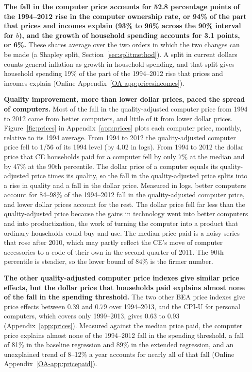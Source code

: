 \documentclass[11pt]{article}
\begin{document}
\textbf{The fall in the computer price accounts for 52.8 percentage points of the 1994--2012 rise in the computer ownership rate, or 94\% of the part that prices and incomes explain (93\% to 96\% across the 90\% interval for $b$), and the growth of household spending accounts for 3.1 points, or 6\%.} These shares average over the two orders in which the two changes can be made (a Shapley split, Section~\ref{sec:splitmethod}). A split in current dollars counts general inflation as growth in household spending, and that split gives household spending 19\% of the part of the 1994--2012 rise that prices and incomes explain (Online Appendix~\ref{OA-app:pricesincomes}).

\label{sec:quality}
\textbf{Quality improvement, more than lower dollar prices, paced the spread of computers.} Most of the fall in the quality-adjusted computer price from 1994 to 2012 came from better computers, and little of it from lower dollar prices. Figure~\ref{fig:prices} in Appendix~\ref{app:prices} plots each computer price, monthly, relative to its 1994 average. From 1994 to 2012 the quality-adjusted computer price fell to 1/56 of its 1994 level (by 4.02 in logs). From 1994 to 2012 the dollar price that CE households paid for a computer fell by only 7\% at the median and by 47\% at the 90th percentile. The dollar price of a computer equals its quality-adjusted price times its quality, so the fall in the quality-adjusted price splits into a rise in quality and a fall in the dollar price. Measured in logs, better computers account for 84--98\% of the 1994--2012 fall in the quality-adjusted computer price, and lower dollar prices account for the rest. The dollar price fell far less than the quality-adjusted price because the gains in technology went into better computers and into productization, the work of turning the computer into a product that ordinary households could buy and use. The median price paid is a noisy series that rose after 2010, which may partly reflect the CE's move of computer accessories to a code of their own in the second quarter of 2011. The 90th percentile is steadier, so the lower bound of 84\% is the firmer number.


\textbf{The other quality-adjusted computer price indexes give similar price effects, but the dollar price that households paid explains almost none of the fall in the spending threshold.} The two other BEA price indexes give price effects between 0.39 and 0.79 over 1994--2013, and the CPI-U for personal computers, which covers only 1999--2013, gives 0.63 to 0.93 (Appendix~\ref{app:prices}). Measured against the median price paid, the computer price explains almost none of the 1994--2012 fall in the spending threshold, a fall of 81\% in the baseline regression and 89\% in the extended regression, and an unexplained trend of 8--12\% a year accounts for nearly all of that fall (Online Appendix~\ref{OA-app:pricepaid}).
\end{document}
